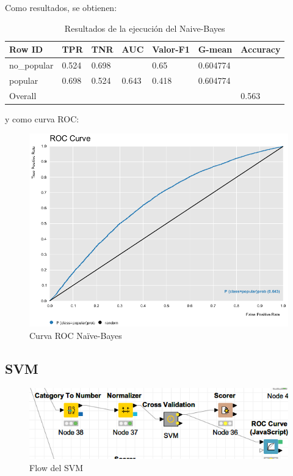 Como resultados, se obtienen:

\begin{table}[H]
	\centering
	\begin{tabular}{|l|l|l|l|l|l|l|}
		\hline
		Row ID      & TPR   & TNR   & AUC   & Valor-F1 & G-mean   & Accuracy \\ \hline
		no\_popular & 0.524 & 0.698 &       & 0.65     & 0.604774 &          \\ \hline
		popular     & 0.698 & 0.524 & 0.643 & 0.418    & 0.604774 &          \\ \hline
		Overall     &       &       &       &          &          & 0.563    \\ \hline
	\end{tabular}
	\caption{Resultados de la ejecución del Naive-Bayes}
	\label{tab:nb}
\end{table}

y como curva ROC:


\begin{figure}[H] %
	\centering
	\includegraphics[scale=0.38]{roc-nb-p.png}  %
	\caption{Curva ROC Naïve-Bayes} 
	\label{fig:rocknb-p}
\end{figure}

\subsection{SVM}

\begin{figure}[H] %
	\centering
	\includegraphics[scale=0.4]{flow-svm-p.png}  %
	\caption{Flow del SVM} 
	\label{fig:flow-svm}
\end{figure}

